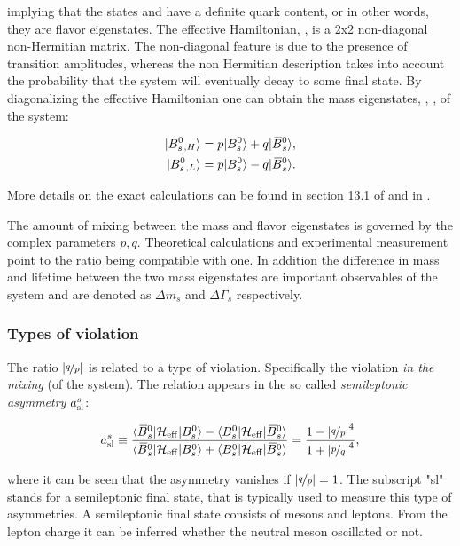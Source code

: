 \noindent implying that the states \Bs and \Bsb have a definite quark content, or in other words,
they are flavor eigenstates. The effective Hamiltonian, \Heff, is a 2x2 non-diagonal non-Hermitian matrix.
The non-diagonal feature is due to the presence of \BBbarSyst transition amplitudes,
whereas the non Hermitian description takes into account the probability that the system will
eventually decay to some final state. By diagonalizing the effective Hamiltonian one can obtain
the mass eigenstates, , , of the system:

\begin{align}
  \centering
  \ket{\Bs{}_{,H}} &= p \ket{\Bs} + q \ket{\Bsb}, \nonumber \\
  \ket{\Bs{}_{,L}} &= p \ket{\Bs} - q \ket{\Bsb}.
  \label{bs_mass_eigen}
\end{align}

\noindent More details on the exact calculations can be found in section 13.1 of \cite{PDG} and in \cite{jeroenThesis,DeBruyn-thesis}.

The amount of mixing between the mass and flavor eigenstates is governed by the complex parameters $p,q$.
Theoretical calculations \cite{Lenz:2011ti} and experimental measurement \cite{asl-paper} point to the ratio
\qoverp being compatible with one. In addition the difference in mass and lifetime between the two mass
eigenstates are important observables of the \BBbarSyst system and are denoted as $\Delta m_s$ and $\Delta\Gamma_s$ respectively.

\subsubsection{Types of \CP violation}
The ratio $|\nicefrac{q}{p}|$ is related to a type of \CP violation. Specifically the \CP violation {\it in the mixing} (of the \BBbarSyst system).
The relation appears in the so called {\it semileptonic asymmetry} $a_{\rm sl}^{s}$:

\begin{equation}
  \centering
  a_{\rm sl}^{s}  \equiv \frac{\bra{\Bsb}\Heff\ket{\Bs} - \bra{\Bs}\Heff\ket{\Bsb}} {\bra{\Bsb}\Heff\ket{\Bs} + \bra{\Bs}\Heff\ket{\Bsb}}
                       = \frac{1 - \left|\nicefrac{q}{p}\right|^4}{1 + \left|\nicefrac{p}{q}\right|^4},
  \label{acp_mixing}
\end{equation}

\noindent where it can be seen that the asymmetry vanishes if $|\nicefrac{q}{p}|= 1$. The subscript "sl" stands for a
semileptonic final state, that is typically used to measure this type of asymmetries. A semileptonic final state
consists of mesons and leptons. From the lepton charge it can be inferred whether the neutral meson oscillated or not.

